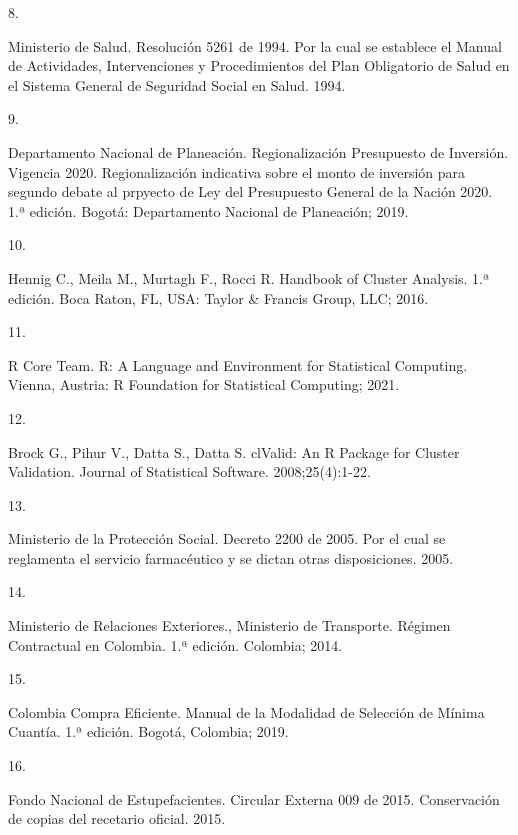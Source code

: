 \documentclass[
  oneside]{book}
\newlength{\cslhangindent}
\newlength{\csllabelwidth}
\newlength{\cslentryspacingunit} %
\newenvironment{CSLReferences}[2] %
 {%
  \setlength{\parindent}{0pt}
  \ifodd #1
  \let\oldpar\par
  \def\par{\hangindent=\cslhangindent\oldpar}
  \fi
  \setlength{\parskip}{#2\cslentryspacingunit}
 }%
 {}
\newcommand{\CSLLeftMargin}[1]{\parbox[t]{\csllabelwidth}{#1}}
\newcommand{\CSLRightInline}[1]{\parbox[t]{\linewidth - \csllabelwidth}{#1}\break}
\begin{document}
\begin{CSLReferences}{0}{0}
\leavevmode{}%
\CSLLeftMargin{8. }
\CSLRightInline{Ministerio de Salud. {Resoluci{ó}n 5261 de 1994. Por la cual se establece el Manual de Actividades, Intervenciones y Procedimientos del Plan Obligatorio de Salud en el Sistema General de Seguridad Social en Salud.} 1994.}

\leavevmode{}%
\CSLLeftMargin{9. }
\CSLRightInline{Departamento Nacional de Planeación. {Regionalizaci{ó}n Presupuesto de Inversi{ó}n. Vigencia 2020. Regionalizaci{ó}n indicativa sobre el monto de inversi{ó}n para segundo debate al prpyecto de Ley del Presupuesto General de la Naci{ó}n 2020}. 1.ª edición. Bogot{á}: Departamento Nacional de Planeaci{ó}n; 2019.}

\leavevmode{}%
\CSLLeftMargin{10. }
\CSLRightInline{Hennig C., Meila M., Murtagh F., Rocci R. {Handbook of Cluster Analysis}. 1.ª edición. Boca Raton, FL, USA: Taylor \& Francis Group, LLC; 2016.}

\leavevmode{}%
\CSLLeftMargin{11. }
\CSLRightInline{R Core Team. R: A Language and Environment for Statistical Computing. Vienna, Austria: R Foundation for Statistical Computing; 2021.}

\leavevmode{}%
\CSLLeftMargin{12. }
\CSLRightInline{Brock G., Pihur V., Datta S., Datta S. {clValid}: An {R} Package for Cluster Validation. Journal of Statistical Software. 2008;25(4):1-22.}

\leavevmode{}%
\CSLLeftMargin{13. }
\CSLRightInline{Ministerio de la Protección Social. {Decreto 2200 de 2005. Por el cual se reglamenta el servicio farmac{é}utico y se dictan otras disposiciones.} 2005.}

\leavevmode{}%
\CSLLeftMargin{14. }
\CSLRightInline{Ministerio de Relaciones Exteriores., Ministerio de Transporte. {R{é}gimen Contractual en Colombia}. 1.ª edición. Colombia; 2014.}

\leavevmode{}%
\CSLLeftMargin{15. }
\CSLRightInline{Colombia Compra Eficiente. {Manual de la Modalidad de Selecci{ó}n de M{í}nima Cuant{í}a}. 1.ª edición. Bogot{á}, Colombia; 2019.}

\leavevmode{}%
\CSLLeftMargin{16. }
\CSLRightInline{Fondo Nacional de Estupefacientes. {Circular Externa 009 de 2015. Conservaci{ó}n de copias del recetario oficial.} 2015.}


\end{CSLReferences}
\end{document}
